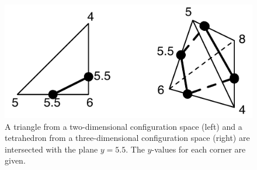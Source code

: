 \begin{figure}[ht]
\centering
\includegraphics[scale=1]{images/simint.pdf}
\caption{A triangle from a two-dimensional configuration space (left) and a tetrahedron from a three-dimensional configuration space (right) are intersected with the plane $y=5.5$. The $y$-values for each corner are given.}
\label{fig:simint}
\end{figure}

